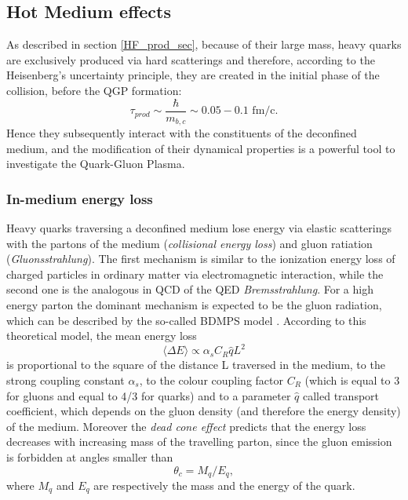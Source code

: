 \documentclass[b5paper,10pt,twoside,oldstyle,classica]{toptesi}
\begin{document}
\subsection{Hot Medium effects}
As described in section \ref{HF_prod_sec}, because of their large mass, heavy quarks are exclusively produced via hard scatterings and therefore, according to the Heisenberg's uncertainty principle, they are created in the initial phase of the collision, before the QGP formation:
\begin{equation}
 \tau_{prod} \sim \frac{\hbar}{m_{b,c}} \sim 0.05 - 0.1\text{ fm/c}.
\end{equation}
Hence they subsequently interact with the constituents of the deconfined medium, and the modification of their dynamical properties is a powerful tool to investigate the Quark-Gluon Plasma. 
\subsubsection{In-medium energy loss}
\label{HF_AA}
Heavy quarks traversing a deconfined medium lose energy via elastic scatterings with the partons of the medium (\textit{collisional energy loss}) and gluon ratiation (\textit{Gluonsstrahlung}). The first mechanism is similar to the ionization energy loss of charged particles in ordinary matter via electromagnetic interaction, while the second one is the analogous in QCD of the QED \textit{Bremsstrahlung}. For a high energy parton the dominant mechanism is expected to be the gluon radiation, which can be described by the so-called BDMPS model \cite{Baier:1996sk}. According to this theoretical model, the mean energy loss 
\begin{equation}
 \langle \Delta E \rangle \propto \alpha_s C_R \hat{q} L^2
\end{equation}
is proportional to the square of the distance L traversed in the medium, to the strong coupling constant $\alpha_s$, to the colour coupling factor $C_R$ (which is equal to 3 for gluons and equal to 4/3 for quarks) and to a parameter $\hat{q}$ called transport coefficient, which depends on the gluon density (and therefore the energy density) of the medium. Moreover the \textit{dead cone effect} \cite{Djordjevic:2003qk} predicts that the energy loss decreases with increasing mass of the travelling parton, since the gluon emission is forbidden at angles smaller than 
\begin{equation}
\theta_c = M_q/E_q,
\end{equation}
where $M_q$ and $E_q$ are respectively the mass and the energy of the quark.
\end{document}
